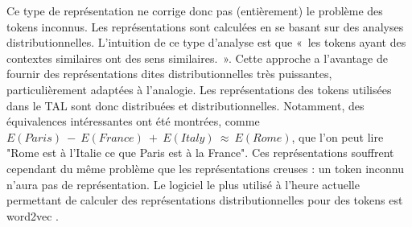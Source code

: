 \documentclass[citation\_needed]{subfiles}
\begin{document}
Ce type de représentation ne corrige donc pas (entièrement) le problème des tokens inconnus. Les représentations sont calculées en se basant sur des analyses distributionnelles. L'intuition de ce type d'analyse est que «\ les tokens ayant des contextes similaires ont des sens similaires.\ ». Cette approche a l'avantage de fournir des représentations dites distributionnelles très puissantes, particulièrement adaptées à l'analogie. Les représentations des tokens utilisées dans le TAL sont donc distribuées et distributionnelles. Notamment, des équivalences intéressantes ont été montrées, comme $E(Paris)\ -\ E(France)\ +\ E(Italy)\ \approx\ E(Rome)$, que l'on peut lire "Rome est à l'Italie ce que Paris est à la France". Ces représentations souffrent cependant du même problème que les représentations creuses : un token inconnu n'aura pas de représentation. Le logiciel le plus utilisé à l'heure actuelle permettant de calculer des représentations distributionnelles pour des tokens est word2vec \citep{mikolov2014word2vec}.
\end{document}

